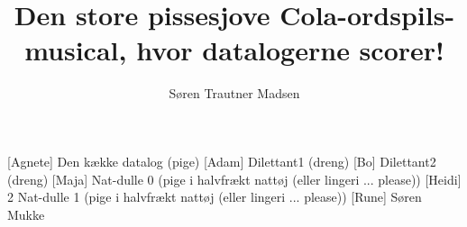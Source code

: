 \documentclass[a4paper,11pt]{article}
\title{Den store pissesjove Cola-ordspils-musical, hvor datalogerne scorer!}
\author{Søren Trautner Madsen}
\begin{document}
\maketitle

\begin{roles}
  [Agnete] Den kække datalog (pige)
  [Adam] Dilettant1 (dreng)
  [Bo] Dilettant2 (dreng)
  [Maja] Nat-dulle 0 (pige i halvfrækt nattøj (eller lingeri ... please))
  [Heidi] 2 Nat-dulle 1 (pige i halvfrækt nattøj (eller lingeri ... please))
  [Rune] Søren Mukke
\end{roles}

\begin{props}
\end{props}
\end{document}
